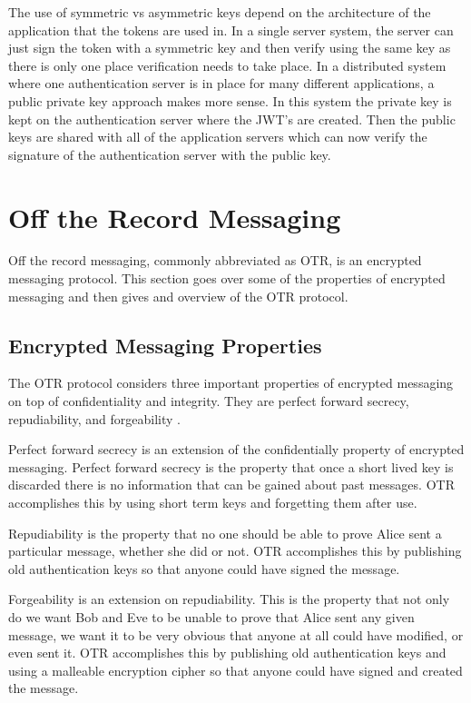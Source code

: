 The use of symmetric vs asymmetric keys depend on the architecture of the application that the tokens are used in. In a single server system, the server can just sign the token with a symmetric key and then verify using the same key as there is only one place verification needs to take place. In a distributed system where one authentication server is in place for many different applications, a public private key approach makes more sense. In this system the private key is kept on the authentication server where the JWT’s are created. Then the public keys are shared with all of the application servers which can now verify the signature of the authentication server with the public key.


\section{Off the Record Messaging}


Off the record messaging, commonly abbreviated as OTR, is an encrypted messaging protocol. This section goes over some of the properties of encrypted messaging and then gives and overview of the OTR protocol.


\subsection{Encrypted Messaging Properties}


The OTR protocol considers three important properties of encrypted messaging on top of confidentiality and integrity. They are perfect forward secrecy, repudiability, and forgeability \cite{otr-paper}.


Perfect forward secrecy is an extension of the confidentially property of encrypted messaging. Perfect forward secrecy is the property that once a short lived key is discarded there is no information that can be gained about past messages. OTR accomplishes this by using short term keys and forgetting them after use. 


Repudiability is the property that no one should be able to prove Alice sent a particular message, whether she did or not. OTR accomplishes this by publishing old authentication keys so that anyone could have signed the message.


Forgeability is an extension on repudiability. This is the property that not only do we want Bob and Eve to be unable to prove that Alice sent any given message, we want it to be very obvious that anyone at all could have modified, or even sent it. OTR accomplishes this by publishing old authentication keys and using a malleable encryption cipher so that anyone could have signed and created the message.


